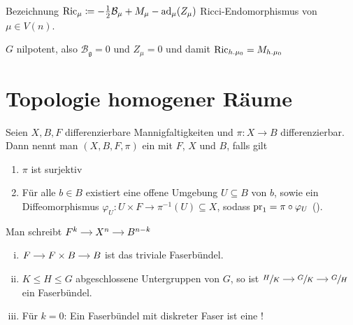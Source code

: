 Bezeichnung $\operatorname{Ric}_\mu \coloneqq -\frac{1}{2} \mathcal{B}_\mu + M_\mu - \operatorname{ad}_\mu(Z_\mu)$ Ricci-Endomorphismus von $\mu \in V(n)$.

\begin{bemerkung*}
	$G$ nilpotent, also $\mathcal{B}_\mathfrak{g} =0$ und $Z_\mu =0$ und damit $\operatorname{Ric}_{h.\mu_0}=M_{h.\mu_0}$
\end{bemerkung*}

\newpage
\section{Topologie homogener Räume} %
\label{sec:33}

\begin{definition}[{name=[Faserbündel]}]
	Seien $X,B,F$ differenzierbare Mannigfaltigkeiten und $\pi \colon X \to B$ differenzierbar.
	Dann nennt man $(X,B,F,\pi)$ ein  mit   $F$,  $X$  und  $B$, falls gilt 
	\begin{enumerate}[1)]
		\item $\pi$ ist surjektiv
		\item Für alle $b \in B$ existiert eine offene Umgebung $U \subseteq B$ von $b$, sowie ein Diffeomorphismus $\varphi_U \colon U \times F \to \pi^{-1}(U) \subseteq X$, sodass $\operatorname{pr}_1 = \pi \circ \varphi_U$ ().
	\end{enumerate}
	Man schreibt 
	\(
		\begin{tikzcd}[cramped,sep=small]
			F^k \rar & X^n \rar & B^{n-k}
		\end{tikzcd}
	\)
\end{definition}

\begin{beispiel*}[{name=[einfache Faserbündel]}]
	\begin{enumerate}[(i)]
		\item \(
			\begin{tikzcd}[cramped,sep=small]
				F \rar & F \times B \rar & B
			\end{tikzcd} 
		\)
		ist das triviale Faserbündel.
		\item $K \le H \le G$ abgeschlossene Untergruppen von $G$, so ist 
		\(
			\begin{tikzcd}[cramped,sep=small]
				\sfrac{H}{K} \rar & \sfrac{G}{K} \rar & \sfrac{G}{H}
			\end{tikzcd}
		\)
		ein Faserbündel.
		\item Für $k=0$: Ein Faserbündel mit diskreter Faser ist eine !
	\end{enumerate}
\end{beispiel*}

